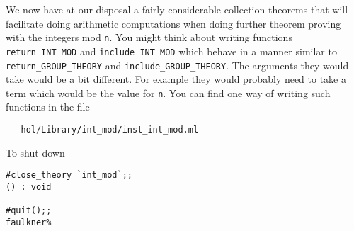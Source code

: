 We now have at our disposal a fairly considerable collection theorems
that will facilitate doing arithmetic computations when doing further
theorem proving with the integers mod {\small\tt n}.  You might think
about writing functions {\small\verb+return_INT_MOD+} and
{\small\verb+include_INT_MOD+} which behave in a manner similar to
{\small\verb+return_GROUP_THEORY+} and
{\small\verb+include_GROUP_THEORY+}.  The arguments they would take would 
be a bit different.  For example they would probably need to take a
term which would be the value for {\small\tt n}.   You can find one way of
writing such functions in the file
\begin{verbatim}
   hol/Library/int_mod/inst_int_mod.ml
\end{verbatim}

To shut down
\begin{session}
\begin{verbatim}
#close_theory `int_mod`;;
() : void

#quit();;
faulkner%
\end{verbatim}
\end{session}


